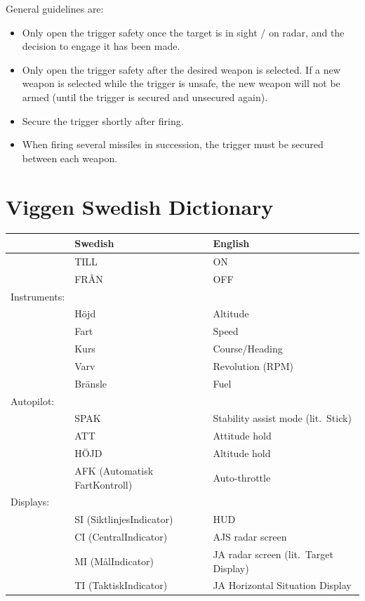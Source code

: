 \documentclass[a4paper]{report}
\begin{document}
General guidelines are:
\begin{itemize}
  \item Only open the trigger safety once the target is in sight / on radar,
    and the decision to engage it has been made.
  \item Only open the trigger safety after the desired weapon is selected.
    If a new weapon is selected while the trigger is unsafe, the new weapon
    will not be armed (until the trigger is secured and unsecured again).
  \item Secure the trigger shortly after firing.
  \item When firing several missiles in succession, the trigger must be secured between each weapon.
\end{itemize}


\appendix
\chapter{Viggen Swedish Dictionary}
\begin{tabular}{ll@{\hspace{1em}}l}
  & Swedish & English \\
  \hline
  & TILL & ON \\
  & FRÅN & OFF \\
  Instruments:\\
  & Höjd & Altitude \\
  & Fart & Speed \\
  & Kurs & Course/Heading \\
  & Varv & Revolution (RPM) \\
  & Bränsle & Fuel \\
  Autopilot: \\
  & SPAK & Stability assist mode (lit.\ Stick) \\
  & ATT & Attitude hold \\
  & HÖJD & Altitude hold \\
  & AFK (Automatisk FartKontroll) & Auto-throttle \\
  Displays: \\
  & SI (SiktlinjesIndicator) & HUD \\
  & CI (CentralIndicator) & AJS radar screen \\
  & MI (MålIndicator) & JA radar screen (lit.\ Target Display) \\
  & TI (TaktiskIndicator) & JA Horizontal Situation Display \\
\end{tabular}
\end{document}
